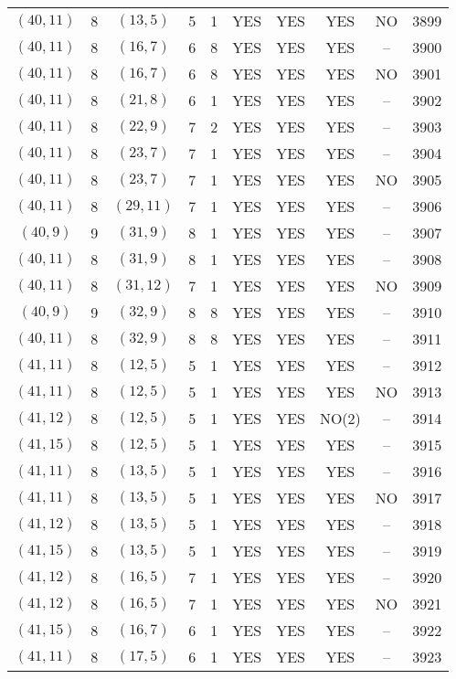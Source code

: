 \begin{longtable}{|c|c|c|c|c|c|c|c|c|c|}
$(40, 11)$ & 8 & $(13, 5)$ & 5 & 1 & YES & YES & YES & NO & 3899\\
$(40, 11)$ & 8 & $(16, 7)$ & 6 & 8 & YES & YES & YES & -- & 3900\\
$(40, 11)$ & 8 & $(16, 7)$ & 6 & 8 & YES & YES & YES & NO & 3901\\
$(40, 11)$ & 8 & $(21, 8)$ & 6 & 1 & YES & YES & YES & -- & 3902\\
$(40, 11)$ & 8 & $(22, 9)$ & 7 & 2 & YES & YES & YES & -- & 3903\\
$(40, 11)$ & 8 & $(23, 7)$ & 7 & 1 & YES & YES & YES & -- & 3904\\
$(40, 11)$ & 8 & $(23, 7)$ & 7 & 1 & YES & YES & YES & NO & 3905\\
$(40, 11)$ & 8 & $(29, 11)$ & 7 & 1 & YES & YES & YES & -- & 3906\\
$(40, 9)$ & 9 & $(31, 9)$ & 8 & 1 & YES & YES & YES & -- & 3907\\
$(40, 11)$ & 8 & $(31, 9)$ & 8 & 1 & YES & YES & YES & -- & 3908\\
$(40, 11)$ & 8 & $(31, 12)$ & 7 & 1 & YES & YES & YES & NO & 3909\\
$(40, 9)$ & 9 & $(32, 9)$ & 8 & 8 & YES & YES & YES & -- & 3910\\
$(40, 11)$ & 8 & $(32, 9)$ & 8 & 8 & YES & YES & YES & -- & 3911\\
$(41, 11)$ & 8 & $(12, 5)$ & 5 & 1 & YES & YES & YES & -- & 3912\\
$(41, 11)$ & 8 & $(12, 5)$ & 5 & 1 & YES & YES & YES & NO & 3913\\
$(41, 12)$ & 8 & $(12, 5)$ & 5 & 1 & YES & YES & NO(2) & -- & 3914\\
$(41, 15)$ & 8 & $(12, 5)$ & 5 & 1 & YES & YES & YES & -- & 3915\\
$(41, 11)$ & 8 & $(13, 5)$ & 5 & 1 & YES & YES & YES & -- & 3916\\
$(41, 11)$ & 8 & $(13, 5)$ & 5 & 1 & YES & YES & YES & NO & 3917\\
$(41, 12)$ & 8 & $(13, 5)$ & 5 & 1 & YES & YES & YES & -- & 3918\\
$(41, 15)$ & 8 & $(13, 5)$ & 5 & 1 & YES & YES & YES & -- & 3919\\
$(41, 12)$ & 8 & $(16, 5)$ & 7 & 1 & YES & YES & YES & -- & 3920\\
$(41, 12)$ & 8 & $(16, 5)$ & 7 & 1 & YES & YES & YES & NO & 3921\\
$(41, 15)$ & 8 & $(16, 7)$ & 6 & 1 & YES & YES & YES & -- & 3922\\
$(41, 11)$ & 8 & $(17, 5)$ & 6 & 1 & YES & YES & YES & -- & 3923\\

\end{longtable}
